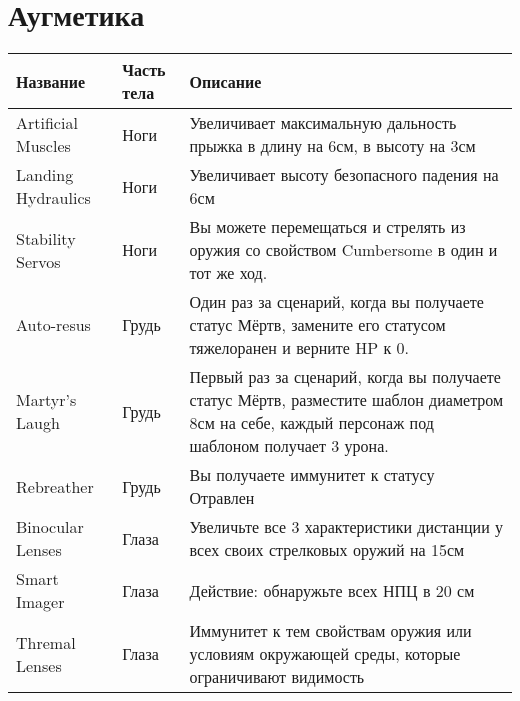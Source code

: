 \section*{Аугметика}
\begin{table}[h]
    \begin{tabularx}{\textwidth}{|l|l|X|}
    \hline
    Название           & Часть тела & Описание                                                                                                                                         \\ \hline
    Artificial Muscles & Ноги       & Увеличивает максимальную дальность прыжка в длину на 6см, в высоту на 3см                                                                        \\ \hline
    Landing Hydraulics & Ноги       & Увеличивает высоту безопасного падения на 6см                                                                                                    \\ \hline
    Stability Servos   & Ноги       & Вы можете перемещаться и стрелять из оружия со свойством Cumbersome в один и тот же ход.                                                         \\ \hline
    Auto-resus         & Грудь      & Один раз за сценарий, когда вы получаете статус Мёртв, замените его статусом тяжелоранен и верните HP к 0.                                       \\ \hline
    Martyr's Laugh     & Грудь      & Первый раз за сценарий, когда вы получаете статус Мёртв, разместите шаблон диаметром 8см на себе, каждый персонаж под шаблоном получает 3 урона. \\ \hline
    Rebreather         & Грудь      & Вы получаете иммунитет к статусу Отравлен                                                                                                        \\ \hline
    Binocular Lenses   & Глаза      & Увеличьте все 3 характеристики дистанции у всех своих стрелковых оружий на 15см                                                                  \\ \hline
    Smart Imager       & Глаза      & Действие: обнаружьте всех НПЦ в 20 см                                                                                                            \\ \hline
    Thremal Lenses     & Глаза      & Иммунитет к тем свойствам оружия или условиям окружающей среды, которые ограничивают видимость                                                   \\ \hline

\end{tabularx}
\end{table}
